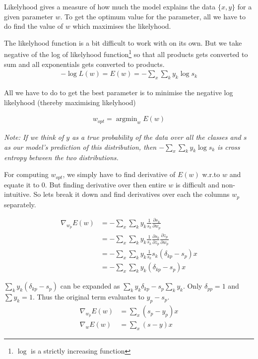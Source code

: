 \documentclass[10pt]{article}
\begin{document}
Likelyhood gives a measure of how much the model explains the data $\{x,y\}$ for a given parameter $w$. To get the optimum value for the parameter, all we have to do find the value of $w$ which maximises the likelyhood. 

The likelyhood function is a bit difficult to work with on its own. But we take negative of the log of likelyhood function\footnote{$\log$ is a strictly increasing function} so that all products gets converted to sum and all exponentials gets converted to products.
$$ \begin{aligned}
-\log L(w) = E(w) = -\sum_x \sum_k y_k \log s_k
\end{aligned} $$

All we have to do to get the best parameter is to minimise the negative log likelyhood (thereby maximising likelyhood)

$$ \begin{aligned}
w_{opt} = \operatorname{argmin}_w  E(w)
\end{aligned} $$

\textit{Note:  If we think of $y$ as a true probability of the data over all the classes and $s$ as our model's prediction of this distribution, then $-\sum_x \sum_k y_k \log s_k$ is cross entropy between the two distributions. }



For computing $w_{opt}$, we simply have to find derivative of $E(w)$ w.r.to $w$ and equate it to 0. But finding derivative over then entire $w$ is difficult and non-intuitive. So lets break it down and find derivatives over each the columns $w_p$ separately.


$$ \begin{aligned}
\nabla_{w_p} E(w) &= -\sum_x \sum_k y_k \frac{1}{s_k} \frac{\partial s_k}{\partial w_p}
\\
&=-\sum_x \sum_k y_k \frac{1}{s_k} \frac{\partial s_k}{\partial z_p} \frac{\partial z_p}{\partial w_p} 
\\
&=-\sum_x \sum_k y_k \frac{1}{s_k} s_k(\delta_{kp} - s_p) x
\\
&= -\sum_x \sum_k y_k (\delta_{kp} - s_p) x
\end{aligned} $$

$\sum_k y_k (\delta_{kp} - s_p)$ can be expanded as $\sum_k y_k \delta_{kp} - s_p\sum_k y_k$. Only $\delta_{pp}=1$ and $\sum y_k =1$. Thus the original term evaluates to $y_p - s_p$.
$$ \begin{aligned}
\nabla_{w_p} E(w) &= \sum_x (s_p - y_p) x
\\
\nabla_{w} E(w) &= \sum_x (s - y) x
\end{aligned} $$
\end{document}
